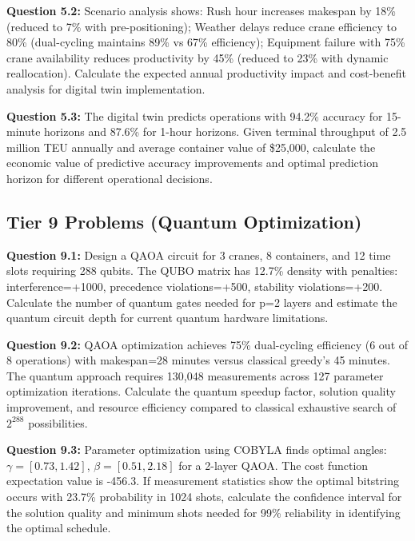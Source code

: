 \documentclass{article}
\begin{document}
\textbf{Question 5.2:} Scenario analysis shows: Rush hour increases makespan by 18\% (reduced to 7\% with pre-positioning); Weather delays reduce crane efficiency to 80\% (dual-cycling maintains 89\% vs 67\% efficiency); Equipment failure with 75\% crane availability reduces productivity by 45\% (reduced to 23\% with dynamic reallocation). Calculate the expected annual productivity impact and cost-benefit analysis for digital twin implementation.

\textbf{Question 5.3:} The digital twin predicts operations with 94.2\% accuracy for 15-minute horizons and 87.6\% for 1-hour horizons. Given terminal throughput of 2.5 million TEU annually and average container value of \$25,000, calculate the economic value of predictive accuracy improvements and optimal prediction horizon for different operational decisions.

\subsection{Tier 9 Problems (Quantum Optimization)}

\textbf{Question 9.1:} Design a QAOA circuit for 3 cranes, 8 containers, and 12 time slots requiring 288 qubits. The QUBO matrix has 12.7\% density with penalties: interference=+1000, precedence violations=+500, stability violations=+200. Calculate the number of quantum gates needed for p=2 layers and estimate the quantum circuit depth for current quantum hardware limitations.

\textbf{Question 9.2:} QAOA optimization achieves 75\% dual-cycling efficiency (6 out of 8 operations) with makespan=28 minutes versus classical greedy's 45 minutes. The quantum approach requires 130,048 measurements across 127 parameter optimization iterations. Calculate the quantum speedup factor, solution quality improvement, and resource efficiency compared to classical exhaustive search of $2^{288}$ possibilities.

\textbf{Question 9.3:} Parameter optimization using COBYLA finds optimal angles: $\gamma=[0.73, 1.42]$, $\beta=[0.51, 2.18]$ for a 2-layer QAOA. The cost function expectation value is -456.3. If measurement statistics show the optimal bitstring occurs with 23.7\% probability in 1024 shots, calculate the confidence interval for the solution quality and minimum shots needed for 99\% reliability in identifying the optimal schedule.
\end{document}
